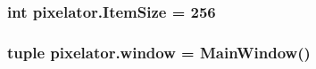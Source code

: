 \subsubsection[{Item\+Size}]{\setlength{\rightskip}{0pt plus 5cm}int pixelator.\+Item\+Size = 256}\label{namespacepixelator_af92308fa1155e29d3f59eef12e78969a}
\hypertarget{namespacepixelator_adb7ae0f85088daea1fd6776505cd28ac}{}
\subsubsection[{window}]{\setlength{\rightskip}{0pt plus 5cm}tuple pixelator.\+window = {\bf Main\+Window}()}\label{namespacepixelator_adb7ae0f85088daea1fd6776505cd28ac}
